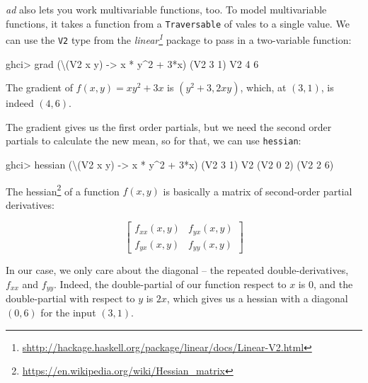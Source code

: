 \documentclass[]{article}
\newenvironment{Shaded}{}{}
\newcommand{\DataTypeTok}[1]{\textcolor[rgb]{0.56,0.13,0.00}{#1}}
\newcommand{\DecValTok}[1]{\textcolor[rgb]{0.25,0.63,0.44}{#1}}
\newcommand{\NormalTok}[1]{#1}
\newcommand{\OperatorTok}[1]{\textcolor[rgb]{0.40,0.40,0.40}{#1}}
\newcommand{\OtherTok}[1]{\textcolor[rgb]{0.00,0.44,0.13}{#1}}
\renewcommand{\href}[2]{#2\footnote{\url{#1}}}
\begin{document}
\emph{ad} also lets you work multivariable functions, too. To model
multivariable functions, it takes a function from a \texttt{Traversable} of
vales to a single value. We can use the \texttt{V2} type from the
\emph{\href{shttp://hackage.haskell.org/package/linear/docs/Linear-V2.html}{linear}}
package to pass in a two-variable function:

\begin{Shaded}
\begin{Highlighting}[]
\NormalTok{ghci}\OperatorTok{>}\NormalTok{ grad (\textbackslash{}(}\DataTypeTok{V2}\NormalTok{ x y) }\OtherTok{{-}>}\NormalTok{ x }\OperatorTok{*}\NormalTok{ y}\OperatorTok{\^{}}\DecValTok{2} \OperatorTok{+} \DecValTok{3}\OperatorTok{*}\NormalTok{x) (}\DataTypeTok{V2} \DecValTok{3} \DecValTok{1}\NormalTok{)}
\DataTypeTok{V2} \DecValTok{4} \DecValTok{6}
\end{Highlighting}
\end{Shaded}

The gradient of \(f(x, y) = x y^2 + 3x\) is \((y^2 + 3, 2xy)\), which, at
\((3, 1)\), is indeed \((4, 6)\).

The gradient gives us the first order partials, but we need the second order
partials to calculate the new mean, so for that, we can use \texttt{hessian}:

\begin{Shaded}
\begin{Highlighting}[]
\NormalTok{ghci}\OperatorTok{>}\NormalTok{ hessian (\textbackslash{}(}\DataTypeTok{V2}\NormalTok{ x y) }\OtherTok{{-}>}\NormalTok{ x }\OperatorTok{*}\NormalTok{ y}\OperatorTok{\^{}}\DecValTok{2} \OperatorTok{+} \DecValTok{3}\OperatorTok{*}\NormalTok{x) (}\DataTypeTok{V2} \DecValTok{3} \DecValTok{1}\NormalTok{)}
\DataTypeTok{V2}\NormalTok{ (}\DataTypeTok{V2} \DecValTok{0} \DecValTok{2}\NormalTok{)}
\NormalTok{   (}\DataTypeTok{V2} \DecValTok{2} \DecValTok{6}\NormalTok{)}
\end{Highlighting}
\end{Shaded}

The \href{https://en.wikipedia.org/wiki/Hessian_matrix}{hessian} of a function
\(f(x,y)\) is basically a matrix of second-order partial derivatives:

\[
\begin{bmatrix}
f_{xx}(x, y) & f_{yx}(x, y) \\
f_{yx}(x, y) & f_{yy}(x, y)
\end{bmatrix}
\]

In our case, we only care about the diagonal -- the repeated double-derivatives,
\(f_{xx}\) and \(f_{yy}\). Indeed, the double-partial of our function respect to
\(x\) is \(0\), and the double-partial with respect to \(y\) is \(2x\), which
gives us a hessian with a diagonal \((0, 6)\) for the input \((3, 1)\).
\end{document}
